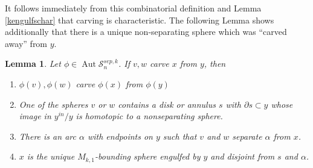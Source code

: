 \documentclass[11pt]{article}
\DeclareMathOperator{\aaut}{Aut}
\newtheorem{lemma}[theorem]{Lemma}
\theoremstyle{remark}
\theoremstyle{definition}
\begin{document}
It follows immediately from this combinatorial definition and
Lemma \ref{kengulfschar} that carving is characteristic.
The following Lemma shows additionally that there is
a unique non-separating sphere which was
``carved away'' from $y$.


\begin{lemma}
  Let $\phi \in \aaut \mathcal S^{sep,k}_{n}$.
  If $v,w$ carve $x$ from $y$,
  then
  \begin{enumerate}[(1)]
  \item $\phi(v), \phi(w)$ carve $\phi(x)$ from $\phi(y)$
  \item One of the spheres $v$ or $w$
  contains a disk or annulus $s$ with $\partial s \subset y$ whose image in $y^{in}/y$
  is homotopic to a nonseparating sphere.
  \item There is an arc $\alpha$ with endpoints on $y$
  such that $v$ and $w$ separate $\alpha$ from $x$.
  \item $x$ is the unique $M_{k,1}$-bounding sphere engulfed by $y$ and disjoint from $s$ and $\alpha$.
\end{enumerate}
\label{carvingchar}
\end{lemma}
\end{document}
